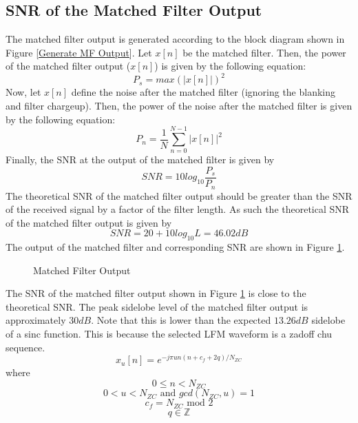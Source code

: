 \documentclass[12pt,letterpaper]{article}
\begin{document}
\subsection{SNR of the Matched Filter Output}
The matched filter output is generated according to the block diagram shown in Figure \ref{Generate MF Output}. Let $x[n]$ be the matched filter. Then, the power of the matched filter output ($x[n]$) is given by the following equation:
\begin{equation}
P_s = max(|x[n]|)^2
\end{equation}
Now, let $x[n]$ define the noise after the matched filter (ignoring the blanking and filter chargeup). Then, the power of the noise after the matched filter is given by the following equation:
\begin{equation}
P_n = \frac{1}{N}\sum_{n=0}^{N-1}|x[n]|^2
\end{equation}
Finally, the SNR at the output of the matched filter is given by
\begin{equation}
SNR = 10log_{10}\frac{P_s}{P_n}
\end{equation}
The theoretical SNR of the matched filter output should be greater than the SNR of the received signal by a factor of the filter length. As such the theoretical SNR of the matched filter output is given by
\begin{equation}
SNR = 20 + 10log_{10}L = 46.02 dB
\end{equation}
The output of the matched filter and corresponding SNR are shown in Figure \ref{MF Output}.
\begin{figure}[H]
\caption{Matched Filter Output}
\label{MF Output}
\end{figure}
\noindent
The SNR of the matched filter output shown in Figure \ref{MF Output} is close to the theoretical SNR. The peak sidelobe level of the matched filter output is approximately $30 dB$. Note that this is lower than the expected $13.26 dB$ sidelobe of a sinc function. This is because the selected LFM waveform is a zadoff chu sequence. 
\begin{equation}
x_u[n] = e^{-j\pi un(n + c_f + 2q)/N_{ZC}}
\end{equation}
where 
$$ 0 \leq n < N_{ZC} $$
$$ 0 < u < N_{ZC} \text{ and } gcd(N_{ZC},u) = 1$$
$$ c_f = N_{ZC} \text{ mod } 2$$
$$ q \in {\mathbb{Z}}$$
\end{document}
